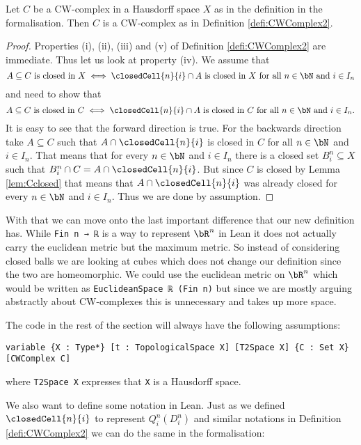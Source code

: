 \begin{lem}
  Let $C$ be a CW-complex in a Hausdorff space $X$ as in the definition in the formalisation. 
  Then $C$ is a CW-complex as in Definition \ref{defi:CWComplex2}. 
\end{lem}
\begin{proof}
  Properties (i), (ii), (iii) and (v) of Definition \ref{defi:CWComplex2} are immediate. 
  Thus let us look at property (iv). 
  We assume that 
  \[A \subseteq C \text{ is closed in } X \iff \closedCell{n}{i} \cap A \text{ is closed in } X \text{ for all } n \in \bN \text{ and } i \in I_n\]
  and need to show that 
  \[A \subseteq C \text{ is closed in } C \iff \closedCell{n}{i} \cap A \text{ is closed in } C \text{ for all } n \in \bN \text{ and } i \in I_n.\]
  It is easy to see that the forward direction is true. 
  For the backwards direction take $A \subseteq C$ such that $A \cap \closedCell{n}{i}$ is closed in $C$ for all $n \in \bN$ and $i \in I_n$. 
  That means that for every $n \in \bN$ and $i \in I_n$ there is a closed set $B_i^n \subseteq X$ such that $B^n_i \cap C = A \cap \closedCell{n}{i}$. 
  But since $C$ is closed by Lemma \ref{lem:Cclosed} that means that $A \cap \closedCell{n}{i}$ was already closed for every $n \in \bN$ and $i \in I_n$. 
  Thus we are done by assumption.
\end{proof}

With that we can move onto the last important difference that our new definition has. 
While \lstinline{Fin n → ℝ} is a way to represent $\bR^n$ in Lean it does not actually carry the euclidean metric but the maximum metric.
So instead of considering closed balls we are looking at cubes which does not change our definition since the two are homeomorphic. 
We could use the euclidean metric on $\bR^n$ which would be written as \lstinline{EuclideanSpace ℝ (Fin n)} but since we are mostly arguing abstractly about CW-complexes this is unnecessary and takes up more space. 

The code in the rest of the section will always have the following assumptions: 

\begin{lstlisting}
variable {X : Type*} [t : TopologicalSpace X] [T2Space X] {C : Set X} [CWComplex C]
\end{lstlisting}

where \lstinline{T2Space X} expresses that \lstinline{X} is a Hausdorff space.

We also want to define some notation in Lean. 
Just as we defined $\closedCell{n}{i}$ to represent $Q^n_i(D_i^n)$ and similar notations in Definition \ref{defi:CWComplex2} we can do the same in the formalisation: 

